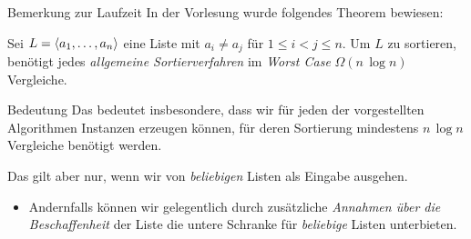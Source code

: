 



\begin{frame}{Bemerkung zur Laufzeit}
In der Vorlesung wurde folgendes Theorem bewiesen:

\begin{theorem}\label{sort:thm:bound}
Sei $L = \langle a_1, \dots, a_n\rangle$ eine Liste mit $a_i \neq a_j$ f\"ur $1 \leq i < j \leq n$.
Um $L$ zu sortieren, ben\"otigt jedes \emph{allgemeine Sortierverfahren} im \emph{Worst Case} $\Omega(n \, \log n)$ Vergleiche.
\end{theorem}

\begin{block}{Bedeutung}
Das bedeutet insbesondere, dass wir f\"ur jeden der vorgestellten Algorithmen Instanzen erzeugen k\"onnen, f\"ur deren Sortierung mindestens $n \, \log n$ Vergleiche ben\"otigt werden.

Das gilt aber nur, wenn wir von \emph{beliebigen} Listen als Eingabe ausgehen.
\begin{itemize}
    \item Andernfalls k\"onnen wir gelegentlich durch zus\"atzliche \emph{Annahmen \"uber die Beschaffenheit} der Liste die untere Schranke f\"ur \emph{beliebige} Listen unterbieten.
\end{itemize}
\end{block}
\end{frame}

